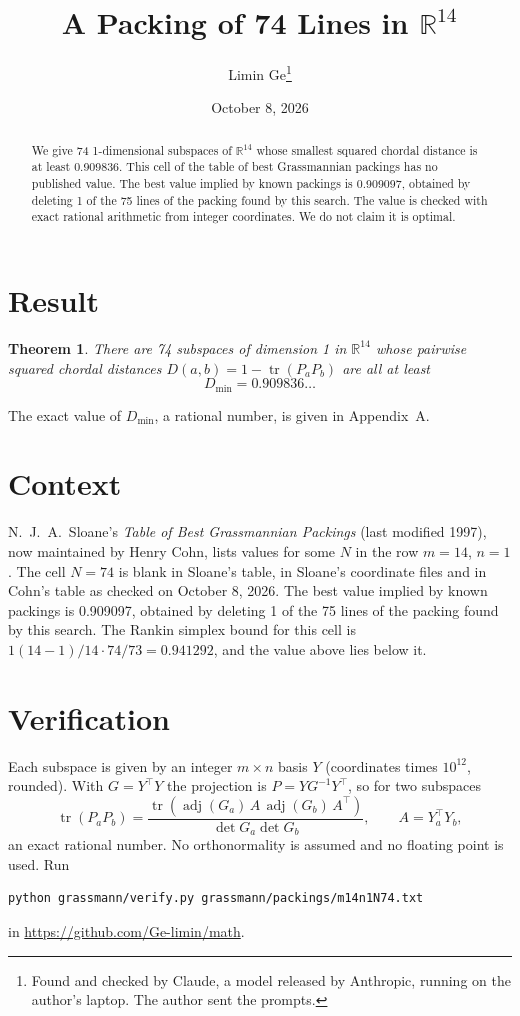 \documentclass[11pt,a4paper]{article}
\title{A Packing of 74 Lines in $\mathbb{R}^{14}$}
\author{Limin Ge\thanks{Found and checked by Claude, a model released by Anthropic, running on the author's laptop. The author sent the prompts.}}
\date{October 8, 2026}
\newtheorem*{theorem}{Theorem}
\begin{document}
\maketitle
\begin{abstract}
We give 74 1-dimensional subspaces of $\mathbb{R}^{14}$ whose smallest squared chordal distance is at least 0.909836. This cell of the table of best Grassmannian packings has no published value. The best value implied by known packings is 0.909097, obtained by deleting 1 of the 75 lines of the packing found by this search. The value is checked with exact rational arithmetic from integer coordinates. We do not claim it is optimal.
\end{abstract}

\section{Result}
\begin{theorem}
There are 74 subspaces of dimension 1 in $\mathbb{R}^{14}$ whose pairwise squared chordal distances $D(a,b) = 1 - \operatorname{tr}(P_aP_b)$ are all at least
\[ D_{\min} = 0.909836\ldots \]
\end{theorem}
The exact value of $D_{\min}$, a rational number, is given in Appendix~A.


\section{Context}
N.~J.~A.~Sloane's \emph{Table of Best Grassmannian Packings} (last modified 1997), now maintained by Henry Cohn, lists values for some $N$ in the row $m=14$, $n=1$. The cell $N=74$ is blank in Sloane's table, in Sloane's coordinate files and in Cohn's table as checked on October 8, 2026. The best value implied by known packings is 0.909097, obtained by deleting 1 of the 75 lines of the packing found by this search. The Rankin simplex bound for this cell is $1(14-1)/14\cdot 74/73 = 0.941292$, and the value above lies below it.


\section{Verification}
Each subspace is given by an integer $m\times n$ basis $Y$ (coordinates times $10^{12}$, rounded). With $G=Y^\top Y$ the projection is $P=YG^{-1}Y^\top$, so for two subspaces
\[ \operatorname{tr}(P_aP_b)=\frac{\operatorname{tr}(\operatorname{adj}(G_a)\,A\,\operatorname{adj}(G_b)\,A^\top)}{\det G_a\det G_b},\qquad A=Y_a^\top Y_b, \]
an exact rational number. No orthonormality is assumed and no floating point is used. Run
\begin{verbatim}
python grassmann/verify.py grassmann/packings/m14n1N74.txt
\end{verbatim}
in \url{https://github.com/Ge-limin/math}.
\end{document}
